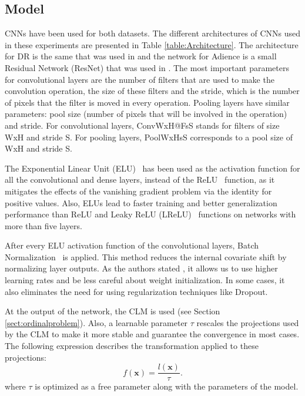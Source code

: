 \documentclass[preprint]{elsarticle}
\begin{document}
\subsection{Model}
\label{sect:model}
CNNs have been used for both datasets. The different architectures of CNNs used in these experiments are presented in Table \ref{table:Architecture}. The architecture for DR is the same that was used in \cite{de2018weighted} and the network for Adience is a small Residual Network (ResNet) \cite{he2016deep} that was used in \cite{beckham2017unimodal}. The most important parameters for convolutional layers are the number of filters that are used to make the convolution operation, the size of these filters and the stride, which is the number of pixels that the filter is moved in every operation. Pooling layers have similar parameters: pool size (number of pixels that will be involved in the operation) and stride. For convolutional layers, ConvWxH@FsS stands for filters of size WxH and stride S. For pooling layers, PoolWxHsS corresponds to a pool size of WxH and stride S.

The Exponential Linear Unit (ELU)~\cite{clevert2015fast} has been used as the activation function for all the convolutional and dense layers, instead of the ReLU~\cite{nair2010rectified} function, as it mitigates the effects of the vanishing gradient problem \cite{bengio1994learning,pascanu2013difficulty} via the identity for positive values. Also, ELUs lead to faster training and better generalization performance than ReLU and Leaky ReLU (LReLU)~\cite{maas2013rectifier} functions on networks with more than five layers.

After every ELU activation function of the convolutional layers, Batch Normalization~\cite{ioffe2015batch} is applied. This method reduces the internal covariate shift by normalizing layer outputs. As the authors stated \cite{ioffe2015batch}, it allows us to use higher learning rates and be less careful about weight initialization. In some cases, it also eliminates the need for using regularization techniques like Dropout.

At the output of the network, the CLM is used (see Section \ref{sect:ordinalproblem}). Also, a learnable parameter $\tau$ rescales the projections used by the CLM to make it more stable and guarantee the convergence in most cases. The following expression describes the transformation applied to these projections:
\begin{equation}
\nonumber
f(\mathbf{x}) = \frac{l(\mathbf{x})}{\tau}.
\end{equation}
where $\tau$ is optimized as a free parameter along with the parameters of the model.
\end{document}
